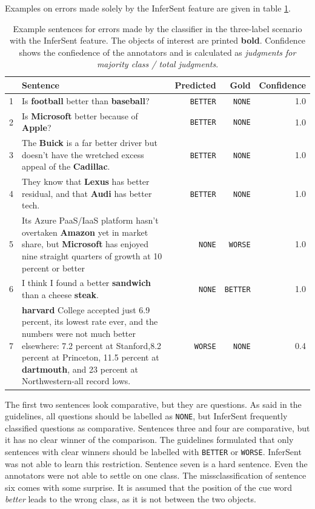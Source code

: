 Examples on errors made solely by the InferSent feature are given in table \ref{tbl:3_mistakes_se}.
\begin{table}[h]
\caption{Example sentences for errors made by the classifier in the three-label scenario with the InferSent feature. The objects of interest are printed \textbf{bold}. Confidence shows the confiedence of the annotators and is calculated as \emph{judgments for majority class / total judgments}.}
\label{tbl:3_mistakes_se}
\begin{tabularx}{\linewidth}{lXrrr}
\toprule
 & Sentence & Predicted & Gold & Confidence \\ \midrule
1& Is \textbf{football} better than \textbf{baseball}? & \texttt{BETTER} & \texttt{NONE} & 1.0\\
2& Is \textbf{Microsoft} better because of \textbf{Apple}? & \texttt{BETTER} & \texttt{NONE} & 1.0\\
 
3& The \textbf{Buick} is a far better driver but doesn't have the wretched excess appeal of the \textbf{Cadillac}. & \texttt{BETTER} & \texttt{NONE} & 1.0\\
4&They know that \textbf{Lexus} has better residual, and that \textbf{Audi} has better tech. & \texttt{BETTER} & \texttt{NONE} & 1.0\\
 
5& Its Azure PaaS/IaaS platform hasn't overtaken \textbf{Amazon} yet in market share, but \textbf{Microsoft} has enjoyed nine straight quarters of growth at 10 percent or better & \texttt{NONE} & \texttt{WORSE} & 1.0\\
 
 6& I think I found a better \textbf{sandwich} than a cheese \textbf{steak}. & \texttt{NONE} & \texttt{BETTER} & 1.0\\
 
7&  \textbf{harvard} College accepted just 6.9 percent, its lowest rate ever, and the numbers were not much better elsewhere: 7.2 percent at Stanford,8.2 percent at Princeton, 11.5 percent at \textbf{dartmouth}, and 23 percent at Northwestern-all record lows. & \texttt{WORSE} & \texttt{NONE} & 0.4\\
\bottomrule
\end{tabularx}
\end{table}

The first two sentences look comparative, but they are questions. As said in the guidelines, all questions should be labelled as \texttt{NONE}, but InferSent frequently classified questions as comparative. Sentences three and four are comparative, but it has no clear winner of the comparison. The guidelines formulated that only sentences with clear winners should be labelled with \texttt{BETTER} or \texttt{WORSE}. InferSent was not able to learn this restriction. Sentence seven is a hard sentence. Even the annotators were not able to settle on one class. The missclassification of sentence six comes with some surprise. It is assumed that the position of the cue word \emph{better} leads to the wrong class, as it is not between the two objects.

